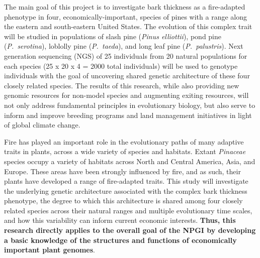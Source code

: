 


The main goal of this project is to investigate bark thickness as a fire-adapted phenotype in four, economically-important, 
species of pines with a range along the eastern and south-eastern United States.  The evolution of this complex trait will 
be studied in populations of slash pine (\textit{Pinus elliottii}), pond pine (\textit{P.\ serotina}), loblolly pine (\textit{P.\ taeda}), 
and long leaf pine (\textit{P.\ palustris}).  Next generation sequencing (NGS) of 25 individuals from 20 natural populations for each 
species (25 x 20 x 4 = 2000 total individuals) will be used to genotype individuals with the goal of uncovering shared 
genetic architecture of these four closely related species. The results of this research, while also providing new genomic 
resources for non-model species and augmenting exiting resources, will not only address fundamental principles in 
evolutionary biology, but also serve to inform and improve breeding programs and land management initiatives in 
light of global climate change.  

Fire has played an important role in the evolutionary paths of many adaptive traits in plants, across a wide variety of species 
and habitats.  Extant \textit{Pinaceae} species occupy a variety of habitats across North and Central America, Asia, and Europe.  
These areas have been strongly influenced by fire, and as such, their plants have developed a range 
of fire-adapted traits.  This study will investigate the underlying genetic architecture associated with the complex 
bark thickness phenotype, the degree to which this architecture is shared among four closely related species across their natural 
ranges and multiple evolutionary time scales, and how this variability can inform current economic interests.  \textbf{Thus, this research 
directly applies to the overall goal of the NPGI by developing a basic knowledge of the structures and functions of economically 
important plant genomes}.


